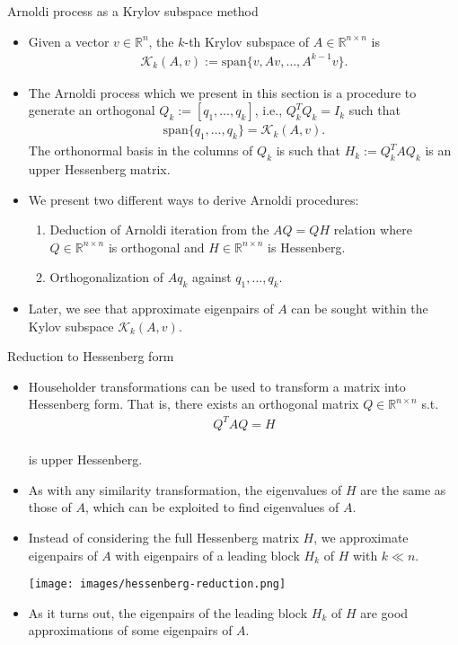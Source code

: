 \documentclass[t,usepdftitle=false]{beamer}
\begin{document}
\begin{frame}{Arnoldi process as a Krylov subspace method}
\begin{itemize}
\item Given a vector $v\in\mathbb{R}^n$, the $k$-th Krylov subspace of $A\in\mathbb{R}^{n\times n}$ is 
\begin{align*}
\mathcal{K}_k(A,v):=\mathrm{span}\{v,Av,\dots,A^{k-1}v\}.
\end{align*}
\item The Arnoldi process which we present in this section is a procedure to generate an orthogonal $Q_k:=[q_1,\dots,q_k]$, i.e., $Q_k^TQ_k=I_k$ such that 
\begin{align*}
\mathrm{span}\{q_1,\dots,q_k\}=\mathcal{K}_k(A,v).
\end{align*}
The orthonormal basis in the columns of $Q_k$ is such that $H_k:=Q_k^TAQ_k$ is an upper Hessenberg matrix. 
\item We present two different ways to derive Arnoldi procedures:
\begin{enumerate}\normalsize
\item Deduction of Arnoldi iteration from the $AQ=QH$ relation where $Q\in\mathbb{R}^{n\times n}$ is orthogonal and $H\in\mathbb{R}^{n\times n}$ is Hessenberg.\vspace{.1cm}
\item Orthogonalization of $Aq_k$ against $q_1,\dots,q_k$.
\end{enumerate}
\item Later, we see that approximate eigenpairs of $A$ can be sought within the Kylov subspace $\mathcal{K}_k(A,v)$.
\end{itemize}
\end{frame}

\begin{frame}{Reduction to Hessenberg form}
\begin{itemize}
\item Householder transformations can be used to transform a matrix into Hessenberg form.
That is, there exists an orthogonal matrix $Q\in\mathbb{R}^{n\times n}$ s.t.
\begin{align*}
Q^TAQ=H
\end{align*}
\vspace{-.5cm}\\
is upper Hessenberg.
\item As with any similarity transformation, the eigenvalues of $H$ are the same as those of $A$, which can be exploited to find eigenvalues of $A$.
\item Instead of considering the full Hessenberg matrix $H$, we approximate eigenpairs of $A$ with eigenpairs of a leading block $H_k$ of $H$ with $k\ll n$.\vspace{.1cm}
\begin{center}
\texttt{[image: images/hessenberg-reduction.png]}
\end{center}
\item As it turns out, the eigenpairs of the leading block $H_k$ of $H$ are good approximations of some eigenpairs of $A$.
\end{itemize}
\end{frame}
\end{document}
